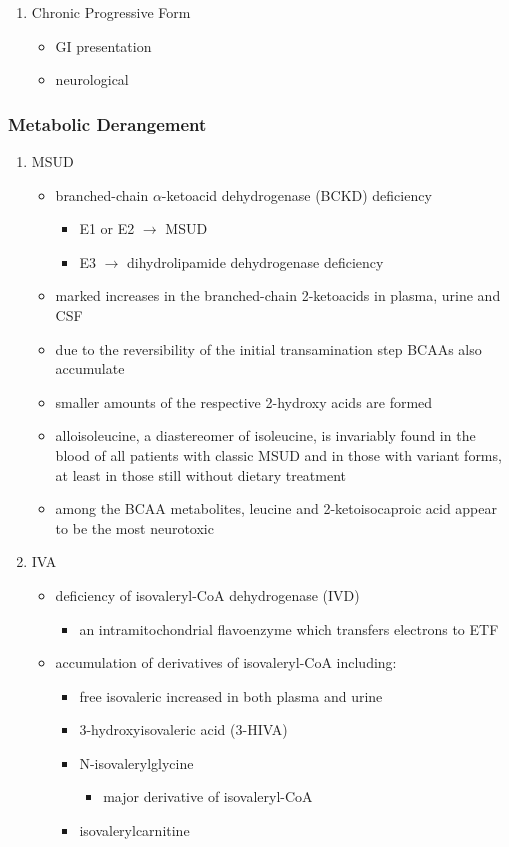 \documentclass{scrartcl}
\begin{document}
\begin{enumerate}
\item Chronic Progressive Form
\label{sec:orgc57e9fd}
\begin{itemize}
\item GI presentation
\item neurological
\end{itemize}
\end{enumerate}

\subsubsection{Metabolic Derangement}
\label{sec:orgd27dd28}
\begin{enumerate}
\item MSUD
\label{sec:org5ad0643}
\begin{itemize}
\item branched-chain \(\alpha\)-ketoacid dehydrogenase (BCKD) deficiency
\begin{itemize}
\item E1 or E2 \(\to\) MSUD
\item E3 \(\to\) dihydrolipamide dehydrogenase deficiency
\end{itemize}

\item marked increases in the branched-chain 2-ketoacids in plasma, urine
and CSF
\item due to the reversibility of the initial transamination step BCAAs
also accumulate
\item smaller amounts of the respective 2-hydroxy acids are formed
\item alloisoleucine, a diastereomer of isoleucine, is invariably found in
the blood of all patients with classic MSUD and in those with
variant forms, at least in those still without dietary treatment
\item among the BCAA metabolites, leucine and 2-ketoisocaproic acid appear
to be the most neurotoxic
\end{itemize}

\item IVA
\label{sec:org88bceb7}
\begin{itemize}
\item deficiency of isovaleryl-CoA dehydrogenase (IVD)
\begin{itemize}
\item an intramitochondrial flavoenzyme which transfers electrons to ETF
\end{itemize}
\item accumulation of derivatives of isovaleryl-CoA including:
\begin{itemize}
\item free isovaleric increased in both plasma and urine
\item 3-hydroxyisovaleric acid (3-HIVA)
\item N-isovalerylglycine
\begin{itemize}
\item major derivative of isovaleryl-CoA
\end{itemize}
\item isovalerylcarnitine
\end{itemize}
\end{itemize}


\end{enumerate}
\end{document}
